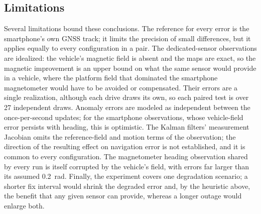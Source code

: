 \subsection{Limitations}
\label{sec:limitations}

Several limitations bound these conclusions. The reference for every error is the smartphone's own GNSS track; it limits the precision of small differences, but it applies equally to every configuration in a pair. The dedicated-sensor observations are idealized: the vehicle's magnetic field is absent and the maps are exact, so the magnetic improvement is an upper bound on what the same sensor would provide in a vehicle, where the platform field that dominated the smartphone magnetometer would have to be avoided or compensated. Their errors are a single realization, although each drive draws its own, so each paired test is over 27 independent draws. Anomaly errors are modeled as independent between the once-per-second updates; for the smartphone observations, whose vehicle-field error persists with heading, this is optimistic. The Kalman filters' measurement Jacobian omits the reference-field and motion terms of the observation; the direction of the resulting effect on navigation error is not established, and it is common to every configuration. The magnetometer heading observation shared by every run is itself corrupted by the vehicle's field, with errors far larger than its assumed 0.2~rad. Finally, the experiment covers one degradation scenario; a shorter fix interval would shrink the degraded error and, by the heuristic above, the benefit that any given sensor can provide, whereas a longer outage would enlarge both.
